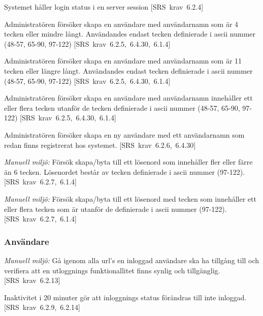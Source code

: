 \documentclass[a4paper]{article}
\def\reqinside{\hfil\penalty 100 \hfilneg \hbox}
\def \req [#1]{\reqinside{[SRS krav #1]}}
\begin{document}
\begin{appendices}
\begin{FT}
\item
Systemet håller login status i en server session \req[6.2.4]

\item
Administratören försöker skapa en användare med användarnamn som är 4 tecken eller mindre långt. Användandes endast tecken definierade i ascii nummer (48-57, 65-90, 97-122)
\req[6.2.5, 6.4.30, 6.1.4]

\item
Administratören försöker skapa en användare med användarnamn som är 11 tecken eller längre långt.
Användandes endast tecken definierade i ascii nummer (48-57, 65-90, 97-122)
\req[6.2.5, 6.4.30, 6.1.4]

\item
Administratören försöker skapa en användare med användarnamn innehåller ett eller flera tecken utanför de tecken definierade i ascii nummer (48-57, 65-90, 97-122)
\req[6.2.5, 6.4.30, 6.1.4]

\item
Administratören försöker skapa en ny användare med ett användarnamn som redan finns registrerat hos systemet.
\req[6.2.6, 6.4.30]

\item
\emph{Manuell miljö:} Försök skapa/byta till ett lösenord som innehåller fler eller färre än 6 tecken. Lösenordet består av tecken definierade i ascii nummer (97-122).
\req[6.2.7, 6.1.4]

\item
\emph{Manuell miljö:} Försök skapa/byta till ett lösenord med tecken som innehåller ett eller flera tecken som är utanför de definierade i ascii nummer (97-122).
\req[6.2.7, 6.1.4]
\end{FT}

\subsubsection{Användare}

\begin{FT}
\item
\emph{Manuell miljö:} Gå igenom alla url's en inloggad användare ska ha tillgång till och verifiera att en utloggnings funktionallitet finns synlig och tillgänglig.
\req[6.2.13]

\item
Inaktivitet i 20 minuter gör att inloggnings status förändras till inte inloggad.
\req[6.2.9, 6.2.14]
\end{FT}


\end{appendices}
\end{document}
